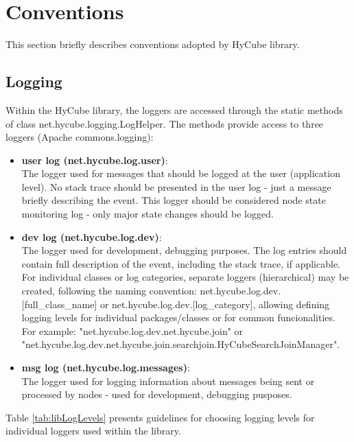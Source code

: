 \section{Conventions}

This section briefly describes conventions adopted by HyCube library.

\subsection{Logging}

Within the HyCube library, the loggers are accessed through the static methods of class net.hycube.logging.LogHelper. The methods provide access to three loggers (Apache commons.logging):

\begin{itemize}
	\renewcommand{\labelitemi}{$\bullet$}
	\item \textbf{user log (net.hycube.log.user)}:\\
	\noindent
	The logger used for messages that should be logged at the user (application level). No stack trace should be presented in the user log - just a message briefly describing the event. This logger should be considered node state monitoring log - only major state changes should be logged.
	\item \textbf{dev log (net.hycube.log.dev)}:\\
	\noindent
	The logger used for development, debugging purposes. The log entries should contain full description of the event, including the stack trace, if applicable. For individual classes or log categories, separate loggers (hierarchical) may be created, following the naming convention: net.hycube.log.dev.[full\_class\_name] or net.hycube.log.dev.[log\_category], allowing defining logging levels for individual packages/classes or for common funcionalities. For example: "net.hycube.log.dev.net.hycube.join" or "net.hycube.log.dev.net.hycube.join.searchjoin.HyCubeSearchJoinManager".
	\item \textbf{msg log (net.hycube.log.messages)}:\\
	\noindent
	The logger used for logging information about messages being sent or processed by nodes - used for development, debugging pusposes.
\end{itemize}

Table \ref{tab:libLogLevels} presents guidelines for choosing logging levels for individual loggers used within the library.

